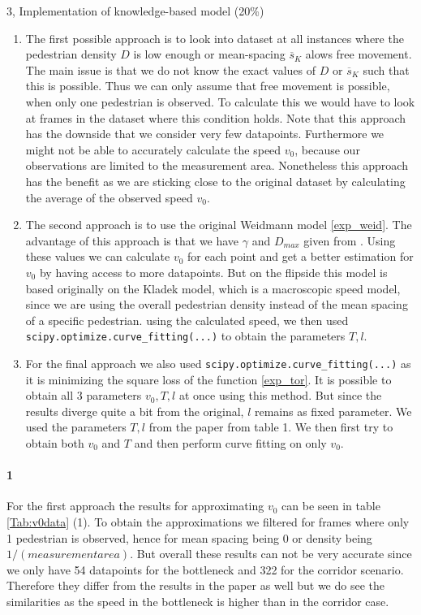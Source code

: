 \begin{task}{3, Implementation of knowledge-based model (20\%)}
\begin{enumerate}
    \item The first possible approach is to look into dataset at all instances where the pedestrian density $D$ is low enough or mean-spacing $\overline{s}_K$ alows free movement. The main issue is that we do not know the exact values of $D$ or $\overline{s}_K$ such that this is possible. Thus we can only assume that free movement is possible, when only one pedestrian is observed. To calculate this we would have to look at frames in the dataset where this condition holds. Note that this approach has the downside that we consider very few datapoints. Furthermore we might not be able to accurately calculate the speed $v_0$, because our observations are limited to the measurement area. Nonetheless this approach has the benefit as we are sticking close to the original dataset by calculating the average of the observed speed $v_0$.
    \item The second approach is to use the original Weidmann model \ref{exp_weid}. The advantage of this approach is that we have $\gamma$ and $D_{max}$ given from \cite{weidmann1993transporttechnik}. Using these values we can calculate $v_0$ for each point and get a better estimation for $v_0$ by having access to more datapoints. But on the flipside this model is based originally on the Kladek model\cite{kladek1966geschwindigkeitscharakteristik}, which is a macroscopic speed model, since we are using the overall pedestrian density instead of the mean spacing of a specific pedestrian. using the calculated speed, we then used \verb|scipy.optimize.curve_fitting(...)| to obtain the parameters $T,l$.
    \item For the final approach we also used \verb|scipy.optimize.curve_fitting(...)| as it is minimizing the square loss of the function \ref{exp_tor}. It is possible to obtain all 3 parameters $v_0,T,l$ at once using this method. But since the results diverge quite a bit from the original, $l$ remains as fixed parameter. We used the parameters $T,l$ from the paper \cite{tordeux2020prediction} from table 1. We then first try to obtain both $v_0$ and $T$ and then perform curve fitting on only $v_0$.
\end{enumerate}

\paragraph{1} For the first approach the results for approximating $v_0$ can be seen in table \ref{Tab:v0data} (1). To obtain the approximations we filtered for frames where only 1 pedestrian is observed, hence for mean spacing being 0 or density being $1/(measurement area)$. But overall these results can not be very accurate since we only have 54 datapoints for the bottleneck and 322 for the corridor scenario. Therefore they differ from the results in the paper as well but we do see the similarities as the speed in the bottleneck is higher than in the corridor case.


\end{task}
